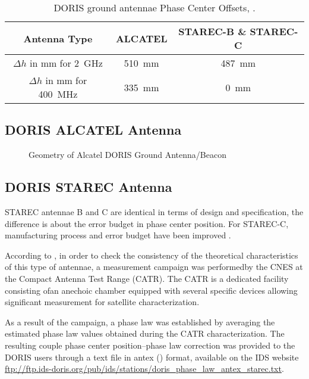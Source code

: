 \begin{table}[h!]
    \centering
    \begin{tabular}{|c|c|c|}
        \hline
        Antenna Type & ALCATEL & STAREC-B \& STAREC-C \\
        \hline
        $\Delta h$ in \si{\mm} for \SI{2}{\GHz} & \SI{510}{\mm} & \SI{487}{\mm}\\
        $\Delta h$ in \si{\mm} for \SI{400}{\MHz} & \SI{335}{\mm} & \SI{0}{\mm}\\
        \hline
    \end{tabular}
    \caption{DORIS ground antennae Phase Center Offsets, \cite{DORISGSM}.}
    \label{table:antenna-pco}
\end{table}

\subsection{DORIS ALCATEL Antenna}

\begin{figure}
\centering

\caption{Geometry of Alcatel DORIS Ground Antenna/Beacon}
\label{fig:alcatel-antenna}
\end{figure}


\subsection{DORIS STAREC Antenna}
STAREC antennae B and C are identical in terms of design and specification, the
difference is about the error budget in phase center position. For STAREC-C,
manufacturing process and error budget have been improved \cite{DORISGSM}.

According to \cite{TOURAIN2016}, in order to check the consistency of the theoretical 
characteristics of this type of antennae, a measurement campaign was performedby 
the CNES at the Compact Antenna Test Range (CATR). The CATR is a dedicated facility 
consisting ofan anechoic chamber equipped with several specific devices 
allowing significant measurement for satellite characterization.

As a result of the campaign, a phase law was established by averaging the estimated 
phase law values obtained during the CATR characterization. The resulting couple phase 
center position–phase law correction was provided to the  DORIS  users  through  a  
text  file  in  \gls{antex} (\cite{ANTEXv14}) format, available on the IDS website
\url{ftp://ftp.ids-doris.org/pub/ids/stations/doris_phase_law_antex_starec.txt}.

